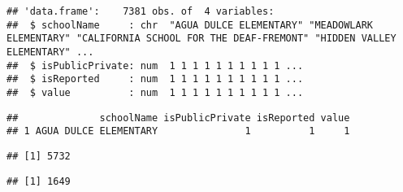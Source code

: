 \documentclass[]{article}
\newenvironment{Shaded}{\begin{snugshade}}{\end{snugshade}}
\newcommand{\CommentTok}[1]{\textcolor[rgb]{0.56,0.35,0.01}{\textit{#1}}}
\newcommand{\DecValTok}[1]{\textcolor[rgb]{0.00,0.00,0.81}{#1}}
\newcommand{\KeywordTok}[1]{\textcolor[rgb]{0.13,0.29,0.53}{\textbf{#1}}}
\newcommand{\NormalTok}[1]{#1}
\newcommand{\OperatorTok}[1]{\textcolor[rgb]{0.81,0.36,0.00}{\textbf{#1}}}
\newcommand{\StringTok}[1]{\textcolor[rgb]{0.31,0.60,0.02}{#1}}
\begin{document}
\begin{verbatim}
## 'data.frame':    7381 obs. of  4 variables:
##  $ schoolName     : chr  "AGUA DULCE ELEMENTARY" "MEADOWLARK ELEMENTARY" "CALIFORNIA SCHOOL FOR THE DEAF-FREMONT" "HIDDEN VALLEY ELEMENTARY" ...
##  $ isPublicPrivate: num  1 1 1 1 1 1 1 1 1 1 ...
##  $ isReported     : num  1 1 1 1 1 1 1 1 1 1 ...
##  $ value          : num  1 1 1 1 1 1 1 1 1 1 ...
\end{verbatim}

\begin{Shaded}
\end{Shaded}

\begin{verbatim}
##              schoolName isPublicPrivate isReported value
## 1 AGUA DULCE ELEMENTARY               1          1     1
\end{verbatim}

\begin{Shaded}
\end{Shaded}

\begin{verbatim}
## [1] 5732
\end{verbatim}

\begin{Shaded}
\end{Shaded}

\begin{verbatim}
## [1] 1649
\end{verbatim}
\end{document}
